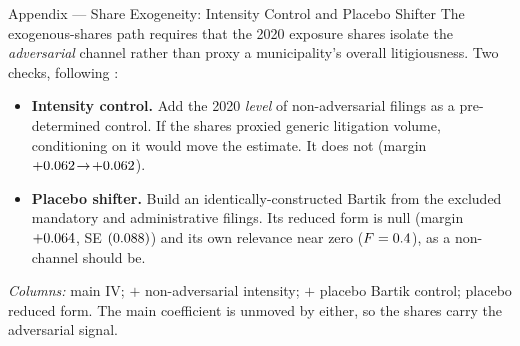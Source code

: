 

\begin{frame}{Appendix --- Share Exogeneity: Intensity Control and Placebo Shifter}
\hypertarget{app:shares}{}
\footnotesize
The exogenous-shares path requires that the 2020 exposure shares isolate the \emph{adversarial} channel rather than proxy a municipality's overall litigiousness. Two checks, following \citet{borusyak2022}:
\begin{itemize}\itemsep0pt
  \item \textbf{Intensity control.} Add the 2020 \emph{level} of non-adversarial filings as a pre-determined control. If the shares proxied generic litigation volume, conditioning on it would move the estimate. It does not (margin $+0.062\!\to\!+0.062$).
  \item \textbf{Placebo shifter.} Build an identically-constructed Bartik from the excluded mandatory and administrative filings. Its reduced form is null (margin $+0.064$, SE $(0.088)$) and its own relevance near zero ($F=0.4$), as a non-channel should be.
\end{itemize}
\vspace{-2pt}
\begin{center}
\scriptsize
\resizebox{!}{0.24\textheight}{}
\end{center}
\vspace{-2pt}
\footnotesize \emph{Columns:} main IV; $+$ non-adversarial intensity; $+$ placebo Bartik control; placebo reduced form. The main coefficient is unmoved by either, so the shares carry the adversarial signal.
\smallskip
\centerline{\hyperlink{src:identbrief}{}}
\end{frame}
